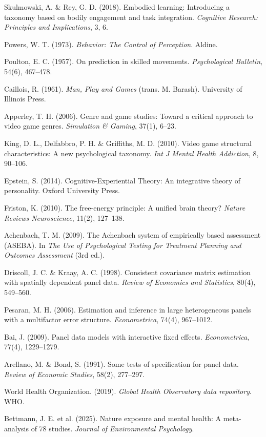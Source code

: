 \documentclass[a4paper,11pt,titlepage]{article}
\begin{document}
\begin{small}
\begin{enumerate}[label={[\arabic*]}, leftmargin=2em, itemsep=2pt]
  \item Skulmowski, A. \& Rey, G. D. (2018). Embodied learning: Introducing a taxonomy based on bodily engagement and task integration. \textit{Cognitive Research: Principles and Implications}, 3, 6.
  \item Powers, W. T. (1973). \textit{Behavior: The Control of Perception}. Aldine.
  \item Poulton, E. C. (1957). On prediction in skilled movements. \textit{Psychological Bulletin}, 54(6), 467--478.
  \item Caillois, R. (1961). \textit{Man, Play and Games} (trans. M. Barash). University of Illinois Press.
  \item Apperley, T. H. (2006). Genre and game studies: Toward a critical approach to video game genres. \textit{Simulation \& Gaming}, 37(1), 6--23.
  \item King, D. L., Delfabbro, P. H. \& Griffiths, M. D. (2010). Video game structural characteristics: A new psychological taxonomy. \textit{Int J Mental Health Addiction}, 8, 90--106.
  \item Epstein, S. (2014). Cognitive-Experiential Theory: An integrative theory of personality. Oxford University Press.
  \item Friston, K. (2010). The free-energy principle: A unified brain theory? \textit{Nature Reviews Neuroscience}, 11(2), 127--138.
  \item Achenbach, T. M. (2009). The Achenbach system of empirically based assessment (ASEBA). In \textit{The Use of Psychological Testing for Treatment Planning and Outcomes Assessment} (3rd ed.).
  \item Driscoll, J. C. \& Kraay, A. C. (1998). Consistent covariance matrix estimation with spatially dependent panel data. \textit{Review of Economics and Statistics}, 80(4), 549--560.
  \item Pesaran, M. H. (2006). Estimation and inference in large heterogeneous panels with a multifactor error structure. \textit{Econometrica}, 74(4), 967--1012.
  \item Bai, J. (2009). Panel data models with interactive fixed effects. \textit{Econometrica}, 77(4), 1229--1279.
  \item Arellano, M. \& Bond, S. (1991). Some tests of specification for panel data. \textit{Review of Economic Studies}, 58(2), 277--297.
  \item World Health Organization. (2019). \textit{Global Health Observatory data repository}. WHO.
  \item Bettmann, J. E. et al. (2025). Nature exposure and mental health: A meta-analysis of 78 studies. \textit{Journal of Environmental Psychology}.

\end{enumerate}
\end{small}
\end{document}
